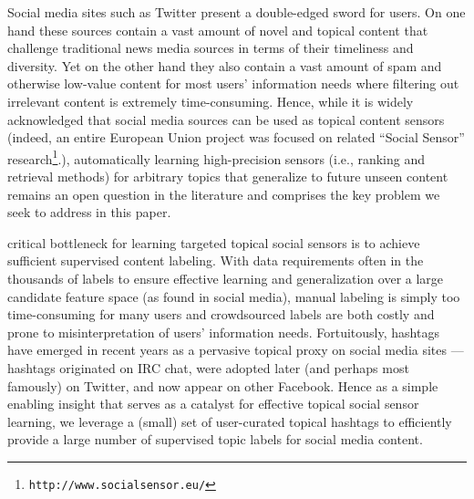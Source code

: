
\label{sec:introduction}

Social media sites such as Twitter present a double-edged sword for
users.  On one hand these sources contain a vast amount of novel and
topical content that challenge traditional news media sources in terms
of their timeliness and diversity.  Yet on the other hand they also
contain a vast amount of spam and otherwise low-value content for most
users' information needs where filtering out irrelevant content is
extremely time-consuming.  Hence, while it is widely acknowledged that
social media sources can be used as topical content sensors (indeed,
an entire European Union project was focused on related ``Social Sensor''
research\footnote{\texttt{http://www.socialsensor.eu/}}.),
automatically learning high-precision sensors (i.e., ranking and
retrieval methods) for arbitrary topics that generalize to future
unseen content remains an open question in the literature and
comprises the key problem we seek to address in this paper.

critical bottleneck for learning targeted topical social
sensors is to achieve sufficient supervised content labeling.  With
data requirements often in the thousands of labels to ensure effective
learning and generalization over a large candidate feature space (as
found in social media),
manual labeling is simply too time-consuming for many users and
crowdsourced labels are both costly and prone to misinterpretation of
users' information needs.  Fortuitously, hashtags have emerged in
recent years as a pervasive topical proxy on social media sites ---
hashtags originated on IRC chat, were adopted later (and perhaps most
famously) on Twitter, and now appear on other 
Facebook.  Hence as a simple enabling
insight that serves as a catalyst for effective topical social sensor
learning, we leverage a (small) set of user-curated topical hashtags
to efficiently provide a large number of supervised topic labels for
social media content.

